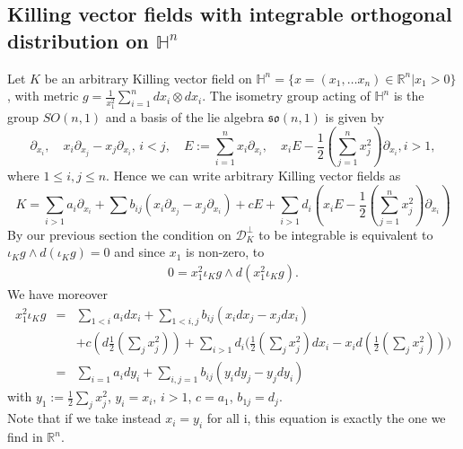 \documentclass[12pt]{article}
\numberwithin{lemma}{section}
\begin{document}
{\subsection{Killing vector fields with integrable orthogonal distribution on $\mathbb{H}^n$}
Let $K$ be an arbitrary Killing vector field on $\mathbb{H}^n=\{x=(x_1,\dots x_n)\in\mathbb{R}^n|x_1>0\}$, with metric $g=\frac{1}{x_1^2}\sum_{i=1}^ndx_i\otimes dx_i$. 
The isometry group acting of $\mathbb{H}^n$ is the group $SO(n,1)$ and a basis of the lie algebra $\mathfrak{so}(n,1)$ is given by
\[\partial_{x_i},\quad x_i\partial_{x_j}-x_j\partial_{x_i},\,i<j,\quad E:=\sum_{i=1}^nx_i\partial_{x_i},\quad
x_i E-\frac{1}{2}(\sum_{j=1}^n x_j^2)\partial_{x_i},i>1,\]
where $1\leq i,j\leq n$. Hence we can write arbitrary Killing vector fields as
\[K=\sum_{i>1}a_i\partial_{x_i}+\sum b_{ij}(x_i\partial_{x_j}-x_j\partial_{x_i})+cE+\sum_{i>1}d_i(x_i E-\frac{1}{2}(\sum_{j=1}^n x_j^2)\partial_{x_i})\]
By our previous section the condition on $\mathcal{D}^{\perp}_K$ to be integrable is equivalent to
$\iota_{K}g\wedge d(\iota_{K}g)=0$ and since $x_1$ is non-zero, to
\begin{eqnarray}\label{eq_integrability_H}0=x_1^2\iota_{K}g\wedge d(x_1^2\iota_{K}g).\end{eqnarray}
We have moreover
\begin{eqnarray*}x_1^2\iota_{K}g&=&\sum_{1<i}a_id{x_i}+\sum_{1<i,j} b_{ij}(x_id{x_j}-x_jd{x_i})\\
&&+c(d\frac{1}{2}(\sum_jx_j^2))+\sum_{i>1}d_i\big(\frac{1}{2}(\sum_jx_j^2)dx_i-x_id(\frac{1}{2}(\sum_jx_j^2))\big)\\
&=&\sum_{i=1}a_id{y_i}+\sum_{i,j=1} b_{ij}(y_id{y_j}-y_jd{y_i})\end{eqnarray*}
with $y_1:=\frac{1}{2}\sum_jx_j^2$, $y_i=x_i,\,i>1$, $c=a_1$, $b_{1j}=d_j$. \\
Note that if we take instead $x_i=y_i$ for all i, this equation is exactly the one we find in $\mathbb{R}^n$.

}
\end{document}
